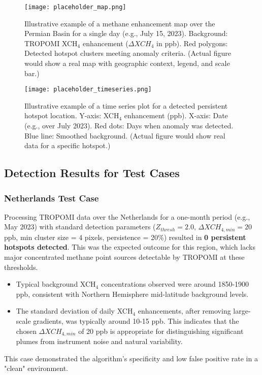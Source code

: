 \documentclass[12pt,a4paper]{article}
\begin{document}
\begin{figure}[H]
    \centering
    \texttt{[image: placeholder\_map.png]} %
    \caption{Illustrative example of a methane enhancement map over the Permian Basin for a single day (e.g., July 15, 2023). Background: TROPOMI XCH$_4$ enhancement ($\Delta XCH_4$ in ppb). Red polygons: Detected hotspot clusters meeting anomaly criteria. (Actual figure would show a real map with geographic context, legend, and scale bar.)}
    \label{fig:sample_map_permian}
\end{figure}

\begin{figure}[H]
    \centering
    \texttt{[image: placeholder\_timeseries.png]} %
    \caption{Illustrative example of a time series plot for a detected persistent hotspot location. Y-axis: XCH$_4$ enhancement (ppb). X-axis: Date (e.g., over July 2023). Red dots: Days when anomaly was detected. Blue line: Smoothed background. (Actual figure would show real data for a specific hotspot.)}
    \label{fig:sample_timeseries}
\end{figure}

\subsection{Detection Results for Test Cases}
\subsubsection{Netherlands Test Case}
Processing TROPOMI data over the Netherlands for a one-month period (e.g., May 2023) with standard detection parameters ($Z_{thresh}=2.0$, $\Delta XCH_{4,min}=20$ ppb, min cluster size = 4 pixels, persistence = 20\%) resulted in \textbf{0 persistent hotspots detected}. This was the expected outcome for this region, which lacks major concentrated methane point sources detectable by TROPOMI at these thresholds.
\begin{itemize}
    \item Typical background XCH$_4$ concentrations observed were around 1850-1900 ppb, consistent with Northern Hemisphere mid-latitude background levels.
    \item The standard deviation of daily XCH$_4$ enhancements, after removing large-scale gradients, was typically around 10-15 ppb. This indicates that the chosen $\Delta XCH_{4,min}$ of 20 ppb is appropriate for distinguishing significant plumes from instrument noise and natural variability.
\end{itemize}
This case demonstrated the algorithm's specificity and low false positive rate in a "clean" environment.
\end{document}
